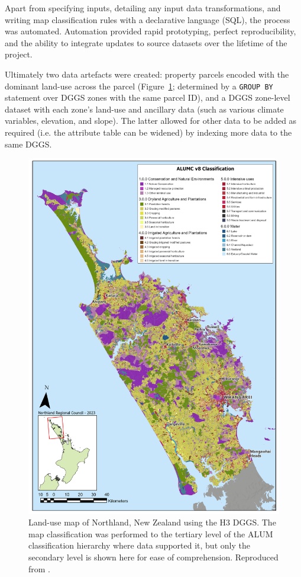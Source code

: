 \documentclass[]{interact}
\theoremstyle{plain}%
\theoremstyle{definition}
\theoremstyle{remark}
\begin{document}
Apart from specifying inputs, detailing any input data transformations, and writing map classification rules with a declarative language (\ac{SQL}), the process was automated. Automation provided rapid prototyping, perfect reproducibility, and the ability to integrate updates to source datasets over the lifetime of the project.

Ultimately two data artefacts were created: property parcels encoded with the dominant land-use across the parcel (Figure~\ref{fig:NRC-ALUM}; determined by a \texttt{GROUP BY} statement over \ac{DGGS} zones with the same parcel ID), and a \ac{DGGS} zone-level dataset with each zone's land-use and ancillary data (such as various climate variables, elevation, and slope). The latter allowed for other data to be added as required (i.e. the attribute table can be widened) by indexing more data to the same DGGS.

\begin{figure}[t]
    \centering
    \includegraphics[width=1\linewidth]{images/NRC_ALUM.png}
    \caption{Land-use map of Northland, New Zealand using the H3 \ac{DGGS}. The map classification was performed to the tertiary level of the \ac{ALUM} classification hierarchy where data supported it, but only the secondary level is shown here for ease of comprehension. Reproduced from \citet{law2023}.}
    \label{fig:NRC-ALUM}
\end{figure}
\end{document}
